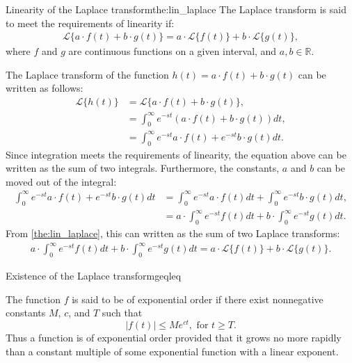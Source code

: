 \begin{theorem}{Linearity of the Laplace transform}{the:lin_laplace}
The Laplace transform is said to meet the requirements of linearity if:
\begin{align*}
\mathcal{L}\{a\cdot f(t)+b\cdot g(t)\}=a\cdot \mathcal{L}\{f(t)\}+b\cdot \mathcal{L}\{g(t)\},
\end{align*}
where $f$ and $g$ are continuous functions on a given interval, and $a, b \in \mathbb{R}$.
\end{theorem}
\begin{prof}{}{}
The Laplace transform of the function $h(t)=a\cdot f(t)+ b \cdot g(t)$ can be written as follows:
\begin{align*}
\mathcal{L}\{h(t)\}&=\mathcal{L}\{a\cdot f(t)+b\cdot g(t)\},
\\
&=\int_{0}^\infty e^{-st}\left(a\cdot f(t)+b\cdot g(t)\right)dt,
\\
&=\int_{0}^\infty e^{-st}a\cdot f(t)+e^{-st}b\cdot g(t)dt.
\end{align*}
Since integration meets the requirements of linearity, the equation above can be written as the sum of two integrals. Furthermore, the constants, $a$ and $b$ can be moved out of the integral:
\begin{align*}
\int_{0}^\infty e^{-st}a\cdot f(t)+e^{-st}b\cdot g(t)dt &=\int_{0}^\infty e^{-st}a\cdot f(t)dt+\int_{0}^\infty e^{-st}b\cdot g(t)dt,
\\
&= a\cdot \int_{0}^\infty e^{-st} f(t)dt+ b \cdot \int_{0}^\infty e^{-st} g(t)dt.
\end{align*}
From \cref{the:lin_laplace}, this can written as the sum of two Laplace transforms:
\begin{align*}
a\cdot \int_{0}^\infty e^{-st} f(t)dt+ b \cdot \int_{0}^\infty e^{-st} g(t)dt =a\cdot \mathcal{L}\{f(t)\}+b\cdot \mathcal{L}\{g(t)\}.
\end{align*}
\end{prof}
\begin{theorem}{Existence of the Laplace transform}{geqleq}

The function $f$ is said to be of exponential order if there exist nonnegative constants $M$, $c$, and $T$  such that $$|f(t)| \leq Me^{ct},    \text{   for } t \geq T.$$
Thus a function is of exponential order provided that it grows no more rapidly than a constant multiple of some exponential function with a linear exponent. \cite[p. 320]{diffandcomplex}
\end{theorem}
